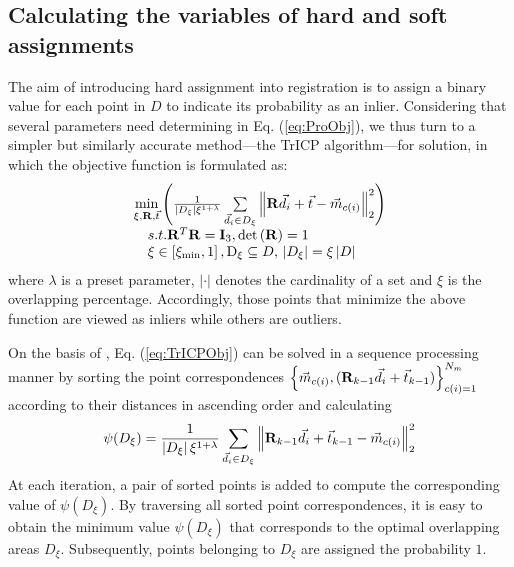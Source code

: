 \documentclass[review]{elsarticle}
\begin{document}
\subsection{Calculating the variables of hard and soft assignments}
The aim of introducing hard assignment into registration is to assign a binary value for each point in $D$ to indicate its probability as an inlier. Considering that several parameters need determining in Eq. (\ref{eq:ProObj}), we thus turn to a simpler but similarly accurate method---the TrICP algorithm---for solution, in which the objective function is formulated as:
\begin{equation}
{\begin{array}{l}
\mathop {\min }\limits_{\xi ,{\bf{R}},\vec t } \left( {\frac{1}{{\left| {{D_\xi }} \right|{\xi ^{1 + \lambda }}}}\sum\limits_{{{\vec d }_i} \in {D_\xi }} {\left\| {{\bf{R}}{{\vec d }_i} + \vec t  - {{\vec m }_{c(i)}}} \right\|_2^2} } \right)\\
\quad s.t.{\rm{  }}{{\bf{R}}^T}{\bf{R}} = {{\bf{I}}_3},{\rm{  det}}\left( {\bf{R}} \right) = 1\\
\quad {\rm{     }}\xi  \in \left[ {{\xi _{\min }},1} \right],{\rm{ }}{{\rm{D}}_\xi } \subseteq D,{\rm{  }}\left| {{D_\xi }} \right| = \xi \left| D \right|
\end{array}}
\label{eq:TrICPObj}
\end{equation}
where $\lambda $ is a preset parameter, $\left|  \cdot  \right|$ denotes the cardinality of a set and $\xi $ is the overlapping percentage. Accordingly, those points that minimize the above function are viewed as inliers while others are outliers.

On the basis of \cite{Phillips07}, Eq. (\ref{eq:TrICPObj}) can be solved in a sequence processing manner by sorting the point correspondences $\left\{ {{{\vec m }_{c(i)}},({{\bf{R}}_{k - 1}}{{\vec d }_i} + {{\vec t }_{k - 1}})} \right\}_{c(i) = 1}^{{N_m}}$ according to their distances in ascending order and calculating
\begin{equation}
{\psi ({D_\xi }) = \frac{1}{{\left| {{D_\xi }} \right|{\xi ^{1 + \lambda }}}}\sum\limits_{{{\vec d }_i} \in {D_\xi }} {\left\| {{{\bf{R}}_{k - 1}}{{\vec d }_i} + {{\vec t }_{k - 1}} - {{\vec m }_{c(i)}}} \right\|_2^2} }
\label{eq:TrICPSol}
\end{equation}
At each iteration, a pair of sorted points is added to compute the corresponding value of $\psi ({D_\xi })$. By traversing all sorted point correspondences, it is easy to obtain the minimum value $\psi ({D_\xi })$ that corresponds to the optimal overlapping areas ${D_\xi }$. Subsequently, points belonging to ${D_\xi }$ are assigned the probability $1$.
\end{document}
